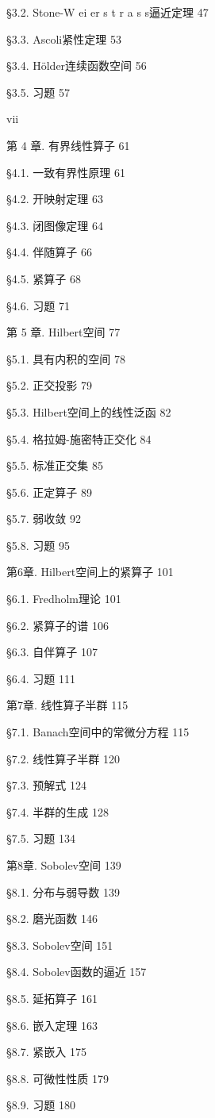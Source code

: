 \documentclass[10pt,b5paper,openany,twoside]{ctexbook}
\begin{document}
§3.2. Stone-W ei er s t r a s s逼近定理 47

§3.3. Ascoli紧性定理 53

§3.4. Hölder连续函数空间 56

§3.5. 习题 57

vii

第 4 章. 有界线性算子 61

§4.1. 一致有界性原理 61

§4.2. 开映射定理 63

§4.3. 闭图像定理 64

§4.4. 伴随算子 66

§4.5. 紧算子 68

§4.6. 习题 71

第 5 章. Hilbert空间 77

§5.1. 具有内积的空间 78

§5.2. 正交投影 79

§5.3. Hilbert空间上的线性泛函 82

§5.4. 格拉姆-施密特正交化 84

§5.5. 标准正交集 85

§5.6. 正定算子 89

§5.7. 弱收敛 92

§5.8. 习题 95

第6章. Hilbert空间上的紧算子 101

§6.1. Fredholm理论 101

§6.2. 紧算子的谱 106

§6.3. 自伴算子 107

§6.4. 习题 111

第7章. 线性算子半群 115

§7.1. Banach空间中的常微分方程 115

§7.2. 线性算子半群 120

§7.3. 预解式 124

§7.4. 半群的生成 128

§7.5. 习题 134

第8章. Sobolev空间 139

§8.1. 分布与弱导数 139

§8.2. 磨光函数 146

§8.3. Sobolev空间 151

§8.4. Sobolev函数的逼近 157

§8.5. 延拓算子 161

§8.6. 嵌入定理 163

§8.7. 紧嵌入 175

§8.8. 可微性性质 179

§8.9. 习题 180
\end{document}
